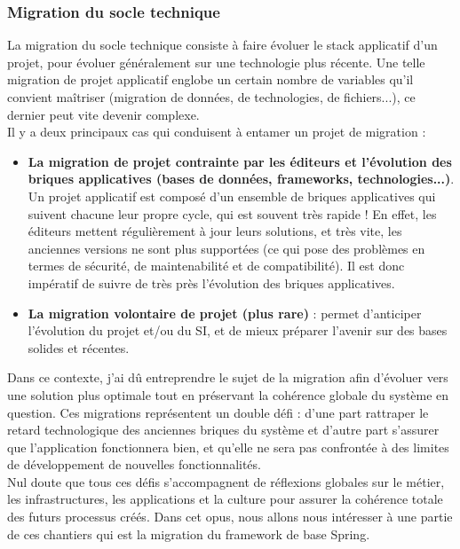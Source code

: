 \subsubsection{Migration du socle technique}
La migration du socle technique consiste à faire évoluer le stack applicatif d'un projet, pour évoluer généralement sur une technologie plus récente. Une telle migration de projet applicatif englobe un certain nombre de variables qu'il convient maîtriser (migration de données, de technologies, de fichiers...), ce dernier peut vite devenir complexe.\\


Il y a deux principaux cas qui conduisent à entamer un projet de migration :
\begin{itemize}
    \item \textbf{La migration de projet contrainte par les éditeurs et l'évolution des briques applicatives (bases de données, frameworks, technologies...)}. Un projet applicatif est composé d'un ensemble de briques applicatives qui suivent chacune leur propre cycle, qui est souvent très rapide ! En effet, les éditeurs mettent régulièrement à jour leurs solutions, et très vite, les anciennes versions ne sont plus supportées (ce qui pose des problèmes en termes de sécurité, de maintenabilité et de compatibilité). Il est donc impératif de suivre de très près l'évolution des briques applicatives.
    \item \textbf{La migration volontaire de projet (plus rare)} : permet d'anticiper l'évolution du projet et/ou du SI, et de mieux préparer l'avenir sur des bases solides et récentes.\\
\end{itemize}

Dans ce contexte, j'ai dû entreprendre le sujet de la migration afin d'évoluer vers une solution plus optimale tout en préservant la cohérence globale du système en question. Ces migrations représentent un double défi : d'une part rattraper le retard technologique des anciennes briques du système et d'autre part s'assurer que l'application fonctionnera bien, et qu'elle ne sera pas confrontée à des limites de développement de nouvelles fonctionnalités.\\

Nul doute que tous ces défis s’accompagnent de réflexions globales sur le métier, les infrastructures, les applications et la culture pour assurer la cohérence totale des futurs processus créés. Dans cet opus, nous allons nous intéresser à une partie de ces chantiers qui est la migration du framework de base Spring.\\

